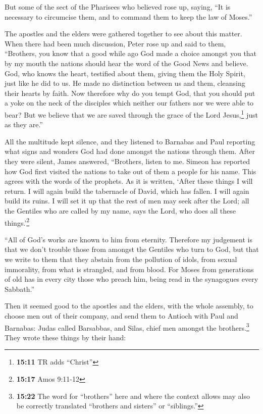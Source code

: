  But some of the sect of the Pharisees who believed rose
up, saying, ``It is necessary to circumcise them, and to command them to
keep the law of Moses.''

 The apostles and the elders were gathered together to see
about this matter.  When there had been much discussion,
Peter rose up and said to them, ``Brothers, you know that a good while
ago God made a choice amongst you that by my mouth the nations should
hear the word of the Good News and believe.  God, who
knows the heart, testified about them, giving them the Holy Spirit, just
like he did to us.  He made no distinction between us and
them, cleansing their hearts by faith.  Now therefore why
do you tempt God, that you should put a yoke on the neck of the
disciples which neither our fathers nor we were able to bear?
 But we believe that we are saved through the grace of
the Lord Jesus,\footnote{\textbf{15:11} TR adds ``Christ''} just as they
are.''

 All the multitude kept silence, and they listened to
Barnabas and Paul reporting what signs and wonders God had done amongst
the nations through them.  After they were silent, James
answered, ``Brothers, listen to me.  Simeon has reported
how God first visited the nations to take out of them a people for his
name.  This agrees with the words of the prophets. As it
is written,  `After these things I will return. I will
again build the tabernacle of David, which has fallen. I will again
build its ruins. I will set it up  that the rest of men
may seek after the Lord; all the Gentiles who are called by my name,
says the Lord, who does all these things.'\footnote{\textbf{15:17} Amos
  9:11-12}

 ``All of God's works are known to him from eternity.
 Therefore my judgement is that we don't trouble those
from amongst the Gentiles who turn to God,  but that we
write to them that they abstain from the pollution of idols, from sexual
immorality, from what is strangled, and from blood.  For
Moses from generations of old has in every city those who preach him,
being read in the synagogues every Sabbath.''

 Then it seemed good to the apostles and the elders, with
the whole assembly, to choose men out of their company, and send them to
Antioch with Paul and Barnabas: Judas called Barsabbas, and Silas, chief
men amongst the brothers.\footnote{\textbf{15:22} The word for
  ``brothers'' here and where the context allows may also be correctly
  translated ``brothers and sisters'' or ``siblings.''} 
They wrote these things by their hand:

